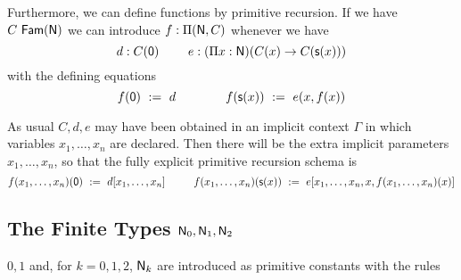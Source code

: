  Furthermore, we can define functions by primitive recursion.  If we have
$C~{\sf Fam}({\sf N})$ we can introduce $f:\Pi({\sf N},C)$ whenever we have
$$
d:C({\sf 0})~~~~~~~e:(\Pi x:{\sf N})(C(x)\rightarrow C({\sf s} (x)))
$$
with the defining equations
$$
f({\sf 0}) ~:=~ d~~~~~~~~~~~~f({\sf s} (x)) ~:=~ e(x,f(x))
$$
 
As usual $C,d,e$ may have been obtained in an implicit context $\Gamma$ in which variables $x_1,\ldots,x_n$ are declared.  Then there will be the extra implicit parameters $x_1,\ldots,x_n$, so that the fully explicit primitive recursion schema is
$$
f(x_1,\dots,x_n)({\sf 0}) ~:=~ d[x_1,\dots,x_n]~~~~~~~~f(x_1,\dots,x_n)({\sf s} (x)) ~:=~ e[x_1,\dots,x_n,x,f(x_1,\dots,x_n)(x)]
$$

\medskip
\subsection*{The Finite Types ${\sf N}_0,{\sf N}_1,{\sf N}_2$}

$0,1$ and, for $k=0,1,2$, ${\sf N}_k$ are introduced as primitive constants with the rules

